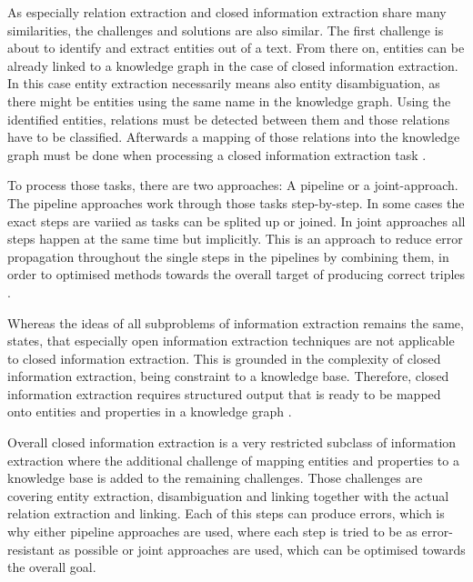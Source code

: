 \documentclass[a4paper,oneside,bibliography=totoc]{scrbook}
\begin{document}
As especially relation extraction and closed information extraction share many similarities, the challenges and solutions are also similar. The first challenge is about to identify and extract entities out of a text. From there on, entities can be already linked to a knowledge graph in the case of closed information extraction. In this case entity extraction necessarily means also entity disambiguation, as there might be entities using the same name in the knowledge graph. Using the identified entities, relations must be detected between them and those relations have to be classified. Afterwards a mapping of those relations into the knowledge graph must be done when processing a closed information extraction task \cite{Josifoski2021,Zhao2024}.

To process those tasks, there are two approaches: A pipeline or a joint-approach. The pipeline approaches work through those tasks step-by-step. In some cases the exact steps are variied as tasks can be splited up or joined. In joint approaches all steps happen at the same time but implicitly. This is an approach to reduce error propagation throughout the single steps in the pipelines by combining them, in order to optimised methods towards the overall target of producing correct triples \cite{Zhao2024,Josifoski2021}.

Whereas the ideas of all subproblems of information extraction remains the same, \citet{Josifoski2021} states, that especially open information extraction techniques are not applicable to closed information extraction. This is grounded in the complexity of closed information extraction, being constraint to a knowledge base. Therefore, closed information extraction requires structured output that is ready to be mapped onto entities and properties in a knowledge graph \cite{Josifoski2021}.

Overall closed information extraction is a very restricted subclass of information extraction where the additional challenge of mapping entities and properties to a knowledge base is added to the remaining challenges. Those challenges are covering entity extraction, disambiguation and linking together with the actual relation extraction and linking. Each of this steps can produce errors, which is why either pipeline approaches are used, where each step is tried to be as error-resistant as possible or joint approaches are used, which can be optimised towards the overall goal.
\end{document}
